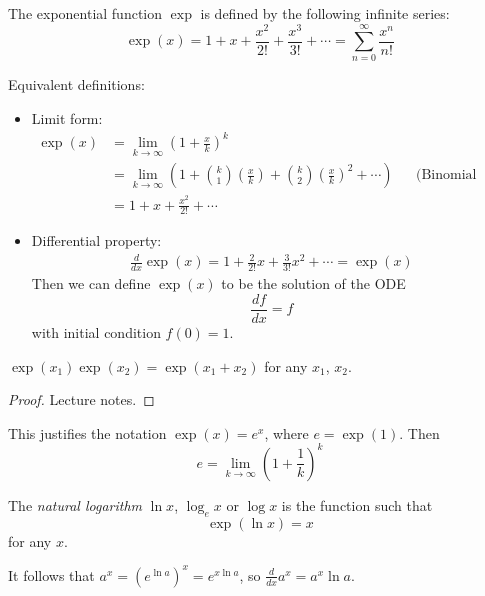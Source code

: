 \documentclass{../../template/note}
\begin{document}
    \begin{definition}
        The exponential function \(\exp\) is defined by the following infinite series:
        \[
            \exp(x) = 1 + x + \frac{x^2}{2!} + \frac{x^3}{3!} + \cdots = \sum_{n=0}^\infty \frac{x^n}{n!}
        \]
    \end{definition}
    
    Equivalent definitions:
    \begin{itemize}
        \item Limit form:
        \begin{align*}
            \exp(x) &= \lim_{k \to \infty} \left(1 + \frac x k\right)^k \\
            &= \lim_{k \to \infty} \left(1 + \binom{k}{1} \left(\frac x k\right) + \binom{k}{2}\left(\frac x k\right)^2 + \cdots\right) && \text{(Binomial thm)} \\
            &= 1 + x + \frac{x^2}{2!} + \cdots
        \end{align*}
        \item Differential property:
        \begin{align*}
            \frac{d}{dx} \exp(x) = 1 + \frac{2}{2!} x + \frac{3}{3!} x^2 + \cdots = \exp(x)
        \end{align*}
        Then we can define \(\exp(x)\) to be the solution of the ODE
        \[
            \frac{df}{dx} = f
        \]
        with initial condition \(f(0) = 1\).
    \end{itemize}

    \begin{proposition}
        \(\exp(x_1)\exp(x_2) = \exp(x_1+x_2)\) for any \(x_1\), \(x_2\).
    \end{proposition}
    
    \begin{proof}
        Lecture notes.
    \end{proof}

    \begin{remark*}
        This justifies the notation \(\exp(x) = e^x\), where \(e = \exp(1)\). Then
        \[
            e = \lim_{k \to \infty} \left(1 + \frac 1 k\right)^k
        \]
    \end{remark*}
    
    
    \begin{definition}
        The \emph{natural logarithm} \(\ln x\), \(\log_e x\) or \(\log x\) is the function such that
        \[
            \exp(\ln x) = x
        \]
        for any \(x\).
    \end{definition}
    It follows that \(a^x = \left(e^{\ln a}\right)^x = e^{x \ln a}\), so \(\frac{d}{dx} a^x = a^x \ln a\).
    
\end{document}
